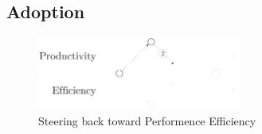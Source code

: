 

\subsection{Adoption} \label{chapter3:software-productivity:adoption}

\begin{figure}[!h]
\begin{center}
\includegraphics[width=0.6\textwidth]{../resources/state-of-the-art-2.pdf}
\end{center}
\caption{Steering back toward Performence Efficiency}
\label{fig:state-of-the-art-2}
\end{figure}


